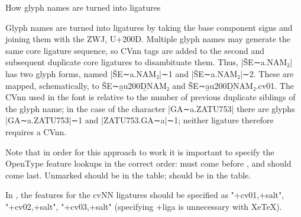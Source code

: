 \Hhh{}How glyph names are turned into ligatures


\par Glyph names are turned into ligatures by taking the base
      component signs and joining them with the ZWJ, U+200D. Multiple
      glyph names may generate the same core ligature sequence, so
      CVnn tags are added to the second and subsequent duplicate core
      ligatures to disambituate them.  Thus, |ŠE∼a.NAM₂| has two glyph
      forms, named |ŠE∼a.NAM₂|∼1 and |ŠE∼a.NAM₂|∼2. These are mapped,
      schematically, to ŠE∼a̲u200D̲NAM₂ and ŠE∼a̲u200D̲NAM₂.cv01. The
      CVnn used in the font is relative to the number of previous
      duplicate siblings of the glyph name; in the case of the
      character |GA∼a.ZATU753| there are glyphs |GA∼a.ZATU753|∼1 and
      |ZATU753.GA∼a|∼1; neither ligature therefore requires a CVnn.


\par Note that in order for this approach to work it is important
      to specify the OpenType feature lookups in the correct order:
       must come before ,
      and  should come last. Unmarked
       should be in the  table;
       should be in the 
      table.


\par In , the features for the cvNN ligatures
      should be specified as "+cv01,+salt", "+cv02,+salt",
      "+cv03,+salt" (specifying +liga is unnecessary with XeTeX).

